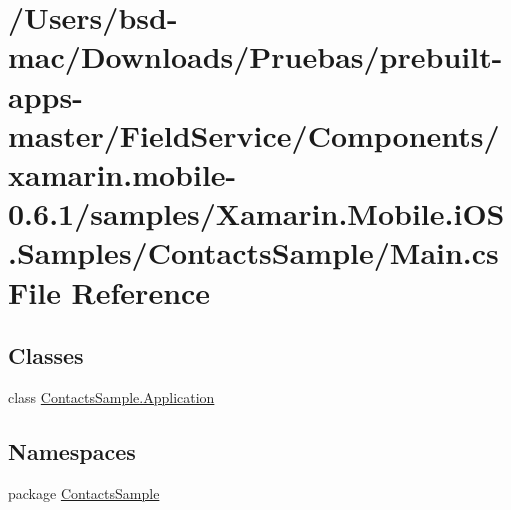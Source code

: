 \hypertarget{_components_2xamarin_8mobile-0_86_81_2samples_2_xamarin_8_mobile_8i_o_s_8_samples_2_contacts_sample_2_main_8cs}{\section{/\+Users/bsd-\/mac/\+Downloads/\+Pruebas/prebuilt-\/apps-\/master/\+Field\+Service/\+Components/xamarin.mobile-\/0.6.1/samples/\+Xamarin.Mobile.\+i\+O\+S.\+Samples/\+Contacts\+Sample/\+Main.cs File Reference}
\label{_components_2xamarin_8mobile-0_86_81_2samples_2_xamarin_8_mobile_8i_o_s_8_samples_2_contacts_sample_2_main_8cs}
}
\subsection*{Classes}
\begin{DoxyCompactItemize}
\item 
class \hyperlink{class_contacts_sample_1_1_application}{Contacts\+Sample.\+Application}
\end{DoxyCompactItemize}
\subsection*{Namespaces}
\begin{DoxyCompactItemize}
\item 
package \hyperlink{namespace_contacts_sample}{Contacts\+Sample}
\end{DoxyCompactItemize}
